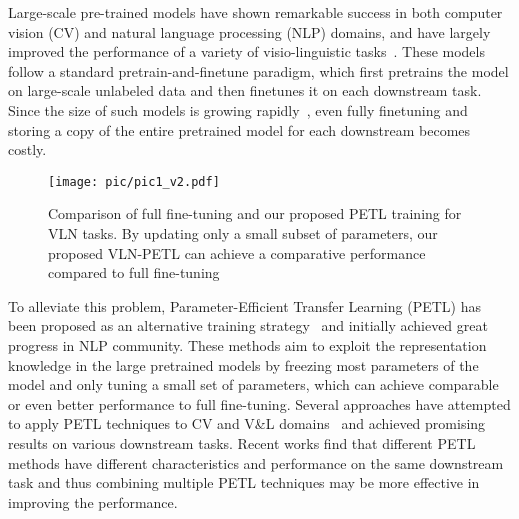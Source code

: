 \documentclass[10pt,twocolumn,letterpaper]{article}
\begin{document}
Large-scale pre-trained models have shown remarkable success in both computer vision (CV) and natural language processing (NLP) domains, and have largely improved the performance of a variety of visio-linguistic tasks~\cite{itr,NiuZLC21REC,reg}.
These models follow a standard pretrain-and-finetune paradigm, which first pretrains the model on large-scale unlabeled data and then finetunes it on each downstream task. Since the size of such models is growing  rapidly~\cite{gpt,clip}, even fully finetuning and storing a copy of the entire pretrained model for each downstream becomes costly. 


\begin{figure}[!t]
	\begin{center}
		\texttt{[image: pic/pic1\_v2.pdf]}
	\end{center}
	\vspace{-20pt}
	\caption{Comparison of full fine-tuning and our proposed PETL training for VLN tasks. By updating only a small subset of parameters, our proposed VLN-PETL can achieve a comparative performance compared to full fine-tuning} 


	\label{fig:pic1}
	\vspace{-19pt}
\end{figure}

To alleviate this problem, Parameter-Efficient Transfer Learning (PETL) has been proposed as an alternative training strategy~\cite{BenZaken2022BitFitSP,HeLYTDCLBS20,houlsby2019adapter, hu2021lora,Mahabadi2021CompacterEL,MahabadiR0H20} and initially achieved great progress in NLP community. These methods aim to exploit the representation knowledge in the large pretrained models by freezing most parameters of the model and only tuning a small set of parameters, which can achieve comparable or even better performance to full fine-tuning. 
Several approaches have attempted to apply PETL techniques to CV and V\&L domains~\cite{KroneckerAdaptation,st-adapter,lst,sung2022vladapter} and achieved promising results on various downstream tasks. Recent works \cite{unified-petl,unipelt,zhang2022hyperpelt} find that different PETL methods have different characteristics and performance on the same downstream task and thus combining multiple PETL techniques may be more effective in improving the performance.
\end{document}
